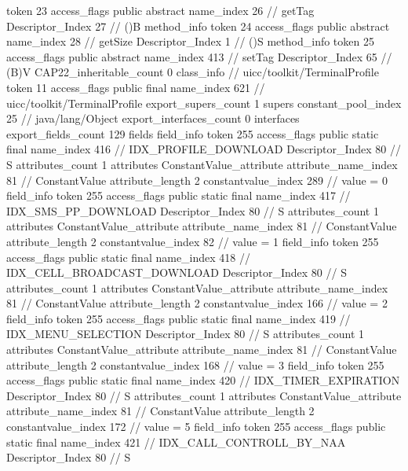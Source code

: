 {{{{{					token	23
					access_flags	public abstract
					name_index	26		// getTag
					Descriptor_Index	27		// ()B
				}
				method_info {
					token	24
					access_flags	public abstract
					name_index	28		// getSize
					Descriptor_Index	1		// ()S
				}
				method_info {
					token	25
					access_flags	public abstract
					name_index	413		// setTag
					Descriptor_Index	65		// (B)V
				}
			}
			CAP22_inheritable_count	0
		}
		class_info {		// uicc/toolkit/TerminalProfile
			token	11
			access_flags	public final
			name_index	621		// uicc/toolkit/TerminalProfile
			export_supers_count	1
			supers {
				constant_pool_index	25		// java/lang/Object
			}
			export_interfaces_count	0
			interfaces {
			}
			export_fields_count	129
			fields {
			field_info {
				token	255
				access_flags	public static final
				name_index	416		// IDX_PROFILE_DOWNLOAD
				Descriptor_Index	80		// S
				attributes_count	1
				attributes {
				ConstantValue_attribute {
					attribute_name_index	81		// ConstantValue
					attribute_length	2
					constantvalue_index	289		// value = 0
				}
				}
			}
			field_info {
				token	255
				access_flags	public static final
				name_index	417		// IDX_SMS_PP_DOWNLOAD
				Descriptor_Index	80		// S
				attributes_count	1
				attributes {
				ConstantValue_attribute {
					attribute_name_index	81		// ConstantValue
					attribute_length	2
					constantvalue_index	82		// value = 1
				}
				}
			}
			field_info {
				token	255
				access_flags	public static final
				name_index	418		// IDX_CELL_BROADCAST_DOWNLOAD
				Descriptor_Index	80		// S
				attributes_count	1
				attributes {
				ConstantValue_attribute {
					attribute_name_index	81		// ConstantValue
					attribute_length	2
					constantvalue_index	166		// value = 2
				}
				}
			}
			field_info {
				token	255
				access_flags	public static final
				name_index	419		// IDX_MENU_SELECTION
				Descriptor_Index	80		// S
				attributes_count	1
				attributes {
				ConstantValue_attribute {
					attribute_name_index	81		// ConstantValue
					attribute_length	2
					constantvalue_index	168		// value = 3
				}
				}
			}
			field_info {
				token	255
				access_flags	public static final
				name_index	420		// IDX_TIMER_EXPIRATION
				Descriptor_Index	80		// S
				attributes_count	1
				attributes {
				ConstantValue_attribute {
					attribute_name_index	81		// ConstantValue
					attribute_length	2
					constantvalue_index	172		// value = 5
				}
				}
			}
			field_info {
				token	255
				access_flags	public static final
				name_index	421		// IDX_CALL_CONTROLL_BY_NAA
				Descriptor_Index	80		// S
}}}}}
